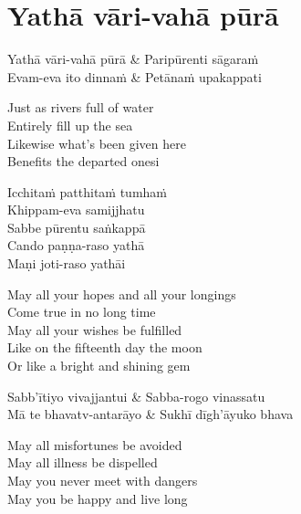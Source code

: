 
\clearpage

\section{Yathā vāri-vahā pūrā}

\begin{twochants}
Yathā vāri-vahā pūrā & Paripūrenti sāgaraṁ\\
Evam-eva ito dinnaṁ & Petānaṁ upakappati\\
\end{twochants}

\begin{english}
Just as rivers full of water\\
Entirely fill up the sea\\
Likewise what’s been given here\\
Benefits the departed onesi
\end{english}


\begin{twochants}
Icchitaṁ patthitaṁ tumhaṁ\\
Khippam-eva samijjhatu\\
Sabbe pūrentu saṅkappā\\
Cando paṇṇa-raso yathā\\
Maṇi joti-raso yathāi
\end{twochants}

\begin{english}
May all your hopes and all your longings\\
Come true in no long time\\
May all your wishes be fulfilled\\
Like on the fifteenth day the moon\\
Or like a bright and shining gem
\end{english}

\begin{twochants}
Sabb’ītiyo vivajjantui & Sabba-rogo vinassatu\\
Mā te bhavatv-antarāyo & Sukhī dīgh’āyuko bhava
\end{twochants}

\begin{english}
May all misfortunes be avoided\\
May all illness be dispelled\\
May you never meet with dangers\\
May you be happy and live long
\end{english}

